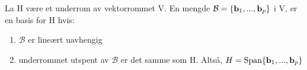La H være et underrom av vektorrommet V.
En mengde $\mathcal{B} = \{ \mathbf{b}_1, ..., \mathbf{b}_p \}$ i V,
er en basis for H hvis:
\begin{enumerate}
  \item $\mathcal{B}$ er lineært uavhengig
  \item underrommet utspent av $\mathcal{B}$ er det samme som H.
        Altså, $H = \text{Span}\{\mathbf{b}_1, ..., \mathbf{b}_p\}$
\end{enumerate}
